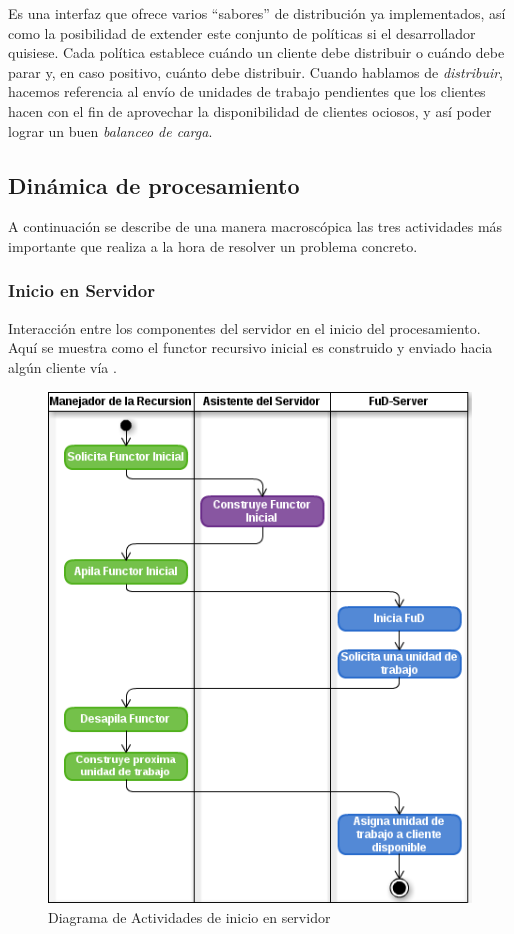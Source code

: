 Es una interfaz que ofrece varios ``sabores'' de distribución ya implementados, así como la posibilidad de extender este conjunto de
políticas si el desarrollador quisiese. Cada política establece cuándo un cliente debe distribuir o cuándo debe parar y, en caso positivo,
cuánto debe distribuir. Cuando hablamos de \textit{distribuir}, hacemos referencia al envío de unidades de trabajo pendientes que los
clientes hacen con el fin de aprovechar la disponibilidad de clientes ociosos, y así poder lograr un buen \textit{balanceo de carga}.


\subsection{Dinámica de procesamiento}\label{dinamic_recabs}
A continuación se describe de una manera macroscópica las tres actividades más importante que realiza \rc{} a la
hora de resolver un problema concreto.

    \subsubsection{Inicio en Servidor}
        Interacción entre los componentes del servidor en el inicio del procesamiento. Aquí se muestra como el functor
        recursivo inicial es construido y enviado hacia algún cliente vía \fud{}.
       
        \begin{figure}[!ht]
            \begin{center}
                \includegraphics[scale=0.75]{images/ActivityRecAbs-1.png}
            \end{center}
            \caption{Diagrama de Actividades de inicio en servidor}
            \label{activity1}
        \end{figure}

